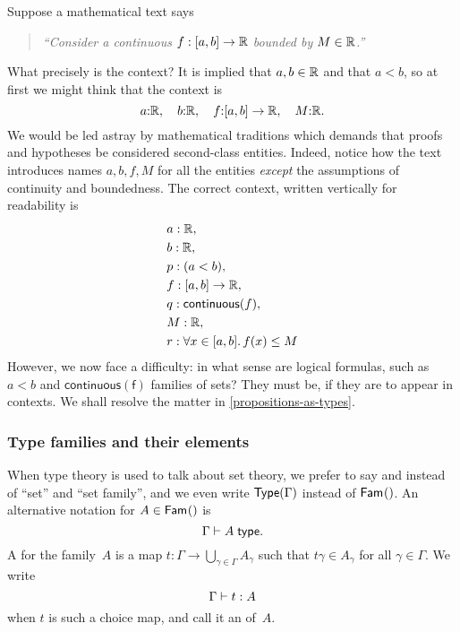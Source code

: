 \begin{example}
  Suppose a mathematical text says
  \begin{quote}
    \emph{``Consider a continuous $f : [a, b] \to \mathbb{R}$ bounded by $M \in \mathbb{R}$.''}
  \end{quote}
  What precisely is the context? It is implied that $a, b \in \mathbb{R}$ and that $a < b$, so
  at first we might think that the context is
  \begin{equation*}
    a {:} \mathbb{R}, \quad
    b {:} \mathbb{R}, \quad
    f {:} [a, b] \to \mathbb{R}, \quad
    M {:} \mathbb{R}.
  \end{equation*}
  We would be led astray by mathematical traditions which demands that proofs and hypotheses be considered second-class entities. Indeed, notice how the text introduces names $a, b, f, M$ for all the entities \emph{except} the assumptions of continuity and boundedness.
  The correct context, written vertically for readability is
  \begin{align*}
    & a : \mathbb{R}, \\
    & b : \mathbb{R}, \\
    & p : (a < b), \\
    & f : [a, b] \to \mathbb{R}, \\
    & q : \mathsf{continuous}(f), \\
    & M : \mathbb{R}, \\
    & r : \forall x \in [a,b] .\, f(x) \leq M
  \end{align*}
  However, we now face a difficulty: in what sense are logical formulas, such as $a < b$ and $\mathsf{continuous(f)}$ families of sets? They must be, if they are to appear in contexts. We shall resolve the matter in \cref{propositions-as-types}.
\end{example}

\subsubsection{Type families and their elements}
\label{sec:type-families}

When type theory is used to talk about set theory, we prefer to say  and  instead of ``set'' and ``set family'', and we even write $\mathsf{Type}(\Gamma)$ instead of $\mathsf{Fam}_{}()$. An alternative notation for $A \in \mathsf{Fam}_{}()$ is
%
\begin{equation*}
  \Gamma \vdash A \;\mathsf{type}.
\end{equation*}
%
A  for the family~$A$ is a map $t : \Gamma \to \bigcup_{\gamma \in \Gamma} A_\gamma$ such that $t \gamma \in A_\gamma$ for all $\gamma \in \Gamma$.
We write
%
\begin{equation*}
  \Gamma \vdash t : A
\end{equation*}
%
when $t$ is such a choice map, and call it an  of~$A$.

